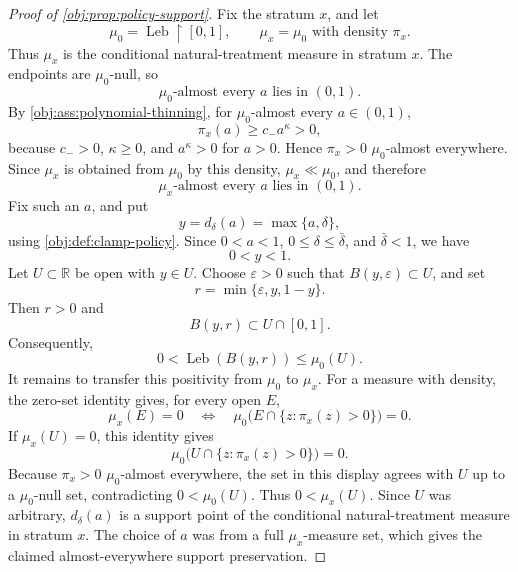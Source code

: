 \documentclass[11pt]{article}
\begin{document}
\begin{proof}[Proof of \cref{obj:prop:policy-support}]
Fix the stratum \(x\), and let
\[
\mu_0=\operatorname{Leb}\!\restriction[0,1],
\qquad
\mu_x=\mu_0\text{ with density }\pi_x .
\]
Thus \(\mu_x\) is the conditional natural-treatment measure in stratum \(x\).  The endpoints are \(\mu_0\)-null, so
\[
\mu_0\text{-almost every }a\text{ lies in }(0,1).
\]%
By \cref{obj:ass:polynomial-thinning}, for \(\mu_0\)-almost every \(a\in(0,1)\),
\[
\pi_x(a)\ge c_- a^\kappa>0,
\]%
because \(c_->0\), \(\kappa\ge0\), and \(a^\kappa>0\) for \(a>0\).  Hence \(\pi_x>0\) \(\mu_0\)-almost everywhere.  Since \(\mu_x\) is obtained from \(\mu_0\) by this density, \(\mu_x\ll\mu_0\), and therefore
\[
\mu_x\text{-almost every }a\text{ lies in }(0,1).
\]%
Fix such an \(a\), and put
\[
y=d_\delta(a)=\max\{a,\delta\},
\]
using \cref{obj:def:clamp-policy}.  Since \(0<a<1\), \(0\leq\delta\leq\bar\delta\), and \(\bar\delta<1\), we have
\[
0<y<1.
\]%
Let \(U\subset\mathbb R\) be open with \(y\in U\).  Choose \(\varepsilon>0\) such that \(B(y,\varepsilon)\subset U\), and set
\[
r=\min\{\varepsilon,y,1-y\}.
\]
Then \(r>0\) and
\[
B(y,r)\subset U\cap[0,1].
\]%
Consequently,
\[
0<\operatorname{Leb}(B(y,r))\leq \mu_0(U).
\]%
It remains to transfer this positivity from \(\mu_0\) to \(\mu_x\).  For a measure with density, the zero-set identity gives, for every open \(E\),
\[
\mu_x(E)=0
\quad\Longleftrightarrow\quad
\mu_0\bigl(E\cap\{z:\pi_x(z)>0\}\bigr)=0 .
\]%
If \(\mu_x(U)=0\), this identity gives
\[
\mu_0\bigl(U\cap\{z:\pi_x(z)>0\}\bigr)=0.
\]
Because \(\pi_x>0\) \(\mu_0\)-almost everywhere, the set in this display agrees with \(U\) up to a \(\mu_0\)-null set, contradicting \(0<\mu_0(U)\).  Thus \(0<\mu_x(U)\).  Since \(U\) was arbitrary, \(d_\delta(a)\) is a support point of the conditional natural-treatment measure in stratum \(x\).  The choice of \(a\) was from a full \(\mu_x\)-measure set, which gives the claimed almost-everywhere support preservation.
\end{proof}




\end{document}
